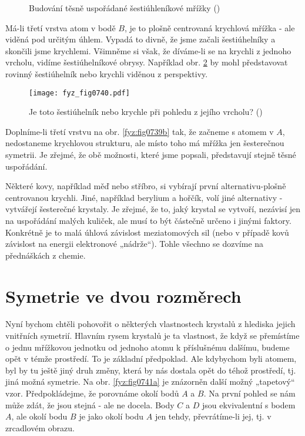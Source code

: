     \begin{figure}[ht!]    %
      \centering
      \label{fyz:fig0739}
      \caption{Budování těsně uspořádané šestiúhleníkové mřížky
               (\cite[s.~548]{Feynman02})}
    \end{figure}

    Má-li třetí vrstva atom v bodě \(B\), je to plošně centrovaná krychlová mřížka - ale viděná pod 
    určitým úhlem. Vypadá to divně, že jsme začali šestiúhelníky a skončili jsme krychlemi. 
    Všimněme si však, že díváme-li se na krychli z jednoho vrcholu, vidíme šestiúhelníkové obrysy. 
    Například obr. \ref{fyz:fig0740} by mohl představovat rovinný šestiúhelník nebo krychli viděnou 
    z perspektivy.
    
    \begin{figure}[ht!] %
      \centering
      \texttt{[image: fyz\_fig0740.pdf]}
      \caption{Je toto šestiúhelník nebo krychle při pohledu z jejího vrcholu?
               (\cite[s.~548]{Feynman02})}
      \label{fyz:fig0740}
    \end{figure}
    
    Doplníme-li třetí vrstvu na obr. \ref{fyz:fig0739b} tak, že začneme s atomem v \(A\), 
    nedostaneme krychlovou strukturu, ale místo toho má mřížka jen šesterečnou symetrii. Je zřejmé, 
    že obě možnosti, které jsme popsali, představují stejně těsné uspořádání.
    
    Některé kovy, například měď nebo stříbro, si vybírají první alternativu-plošně centrovanou 
    krychli. Jiné, například berylium a hořčík, volí jiné alternativy - vytvářejí šesterečné 
    krystaly. Je zřejmé, že to, jaký krystal se vytvoří, nezávisí jen na uspořádání malých kuliček, 
    ale musí to být částečně určeno i jinými faktory. Konkrétně je to malá úhlová závislost 
    meziatomových sil (nebo v případě kovů závislost na energii elektronové „nádrže“). Tohle 
    všechno se dozvíme na přednáškách z chemie.
    
  \section{Symetrie ve dvou rozměrech}\label{fyz:IIchapXXXsecV}
    Nyní bychom chtěli pohovořit o některých vlastnostech krystalů z hlediska jejich vnitřních 
    symetrií. Hlavním rysem krystalů je ta vlastnost, že když se přemístíme o jednu mřížkovou 
    jednotku od jednoho atomu k příslušnému dalšímu, budeme opět v témže prostředí. To je základní 
    předpoklad. Ale kdybychom byli atomem, byl by tu ještě jiný druh změny, která by nás dostala 
    opět do téhož prostředí, tj. jiná možná symetrie. Na obr. \ref{fyz:fig0741a} je znázorněn další 
    možný „tapetový“ vzor. Předpokládejme, že porovnáme okolí bodů \(A\) a \(B\). Na první pohled 
    se nám může zdát, že jsou stejná - ale ne docela. Body \(C\) a \(D\) jsou ekvivalentní s bodem 
    \(A\), ale okolí bodu \(B\) je jako okolí bodu \(A\) jen tehdy, převrátíme-li jej, tj. v 
    zrcadlovém obrazu.

